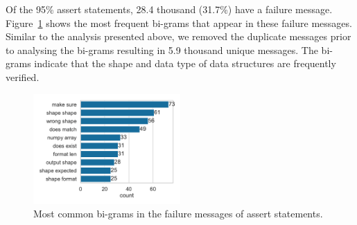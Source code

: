 Of the 95\% assert statements, 28.4 thousand (31.7\%) have a failure message. Figure~\ref{fig:common-assert-msgs} shows the most frequent bi-grams that appear in these failure messages. Similar to the analysis presented above, we removed the duplicate messages prior to analysing the bi-grams resulting in 5.9 thousand unique messages. The bi-grams indicate that the shape and data type of data structures are frequently verified.

\begin{figure}
  \centering
  \includegraphics[width=0.5\textwidth]{common-assert-msgs.pdf}
  \caption{Most common bi-grams in the failure messages of assert statements.}
  \label{fig:common-assert-msgs}
\end{figure}

